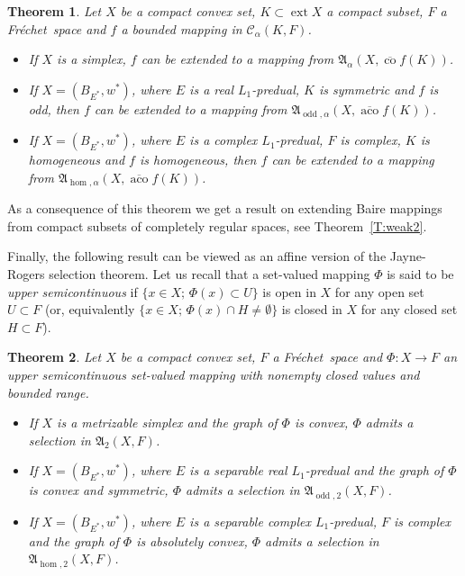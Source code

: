 \documentclass{amsart}
\numberwithin{equation}{section}
\newtheorem{thm}{Theorem}[section]
\theoremstyle{definition}
\def\fra{\mathfrak{A}}
\def\C{\mathcal C}
\def\co{\operatorname{co}}
\def\aco{\operatorname{aco}}
\def\ov{\overline}
\def \ext {\operatorname{ext}}
\def\hom{\operatorname{hom}}
\def\odd{\operatorname{odd}}
\newcommand{\setsep}{;\,}
\newcommand{\fr}{Fr\'echet\ }
\begin{document}
\begin{thm}\label{T:weakDP}
Let $X$ be a compact convex set, $K\subset \ext X$ a compact subset, $F$ a \fr space and $f$ a bounded mapping in $\C_\alpha(K,F)$.
\begin{itemize}
\item[(S)] If $X$ is a simplex, $f$ can be extended to a mapping from $\fra_\alpha(X,\ov{\co} f(K))$.
\item[(R)] If $X=(B_{E^*},w^*)$, where $E$ is a real $L_1$-predual, $K$ is symmetric and $f$ is odd, then $f$ can be extended to a mapping from $\fra_{\odd,\alpha}(X,\ov{\aco} f(K))$.
\item[(C)] If $X=(B_{E^*},w^*)$, where $E$ is a complex $L_1$-predual, $F$ is complex, $K$ is homogeneous and $f$ is homogeneous, then $f$ can be extended to a mapping from $\fra_{\hom,\alpha}(X,\ov{\aco} f(K))$.
\end{itemize}
\end{thm}

As a consequence of this theorem we get a result on extending Baire mappings from compact subsets of completely regular spaces,
see Theorem~\ref{T:weak2}.

Finally, the following result can be viewed as an affine version of the Jayne-Rogers selection theorem. Let us recall that a set-valued mapping $\Phi$ is said to be \emph{upper semicontinuous} if $\{x\in X\setsep\Phi(x)\subset U\}$ is open in $X$ for any open set $U\subset F$ (or, equivalently $\{x\in X\setsep\Phi(x)\cap H\ne\emptyset\}$ is closed in $X$ for any closed set $H\subset F$).

\begin{thm}\label{T:selekceusc}
Let $X$ be a compact convex set, $F$ a \fr space and $\Phi\colon X\to F$ an upper semicontinuous set-valued mapping with nonempty closed values and bounded range.
\begin{itemize}
	\item[(S)] If $X$ is a metrizable simplex  and the graph of $\Phi$ is convex, $\Phi$ admits a selection in $\fra_2(X,F)$.
	\item[(R)] If $X=(B_{E^*},w^*)$, where $E$ is a separable real $L_1$-predual and the graph of $\Phi$ is convex and symmetric, $\Phi$ admits a selection in $\fra_{\odd,2}(X,F)$.
	\item[(C)] If $X=(B_{E^*},w^*)$, where $E$ is a separable complex $L_1$-predual, $F$ is complex and the graph of $\Phi$ is absolutely convex, $\Phi$ admits a selection in $\fra_{\hom,2}(X,F)$.
\end{itemize}
\end{thm}
\end{document}
